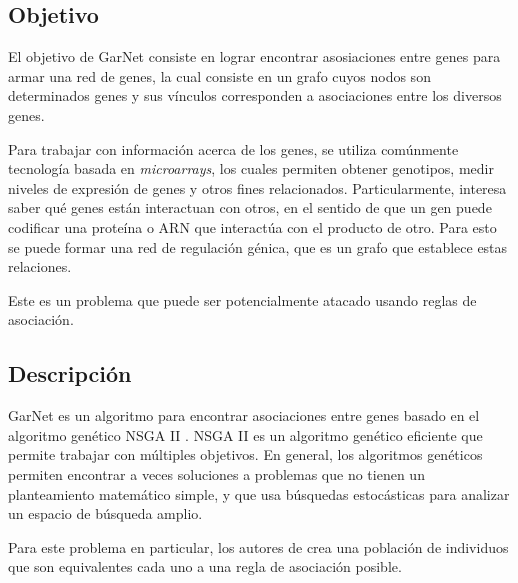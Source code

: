 \documentclass[12pt,spanish]{article}
\begin{document}
\subsection{Objetivo}
El objetivo de GarNet \cite{gene} consiste en lograr encontrar asosiaciones entre genes para armar una red de genes, la cual consiste en un grafo cuyos nodos son determinados genes y sus vínculos corresponden a asociaciones entre los diversos genes.

Para trabajar con información acerca de los genes, se utiliza comúnmente tecnología basada en \emph{microarrays}, los cuales permiten obtener genotipos, medir niveles de expresión de genes y otros fines relacionados. Particularmente, interesa saber qué genes están interactuan con otros, en el sentido de que un gen puede codificar una proteína o ARN que interactúa con el producto de otro. Para esto se puede formar una red de regulación génica, que es un grafo que establece estas relaciones.

Este es un problema que puede ser potencialmente atacado usando reglas de asociación.
\subsection{Descripción}
GarNet es un algoritmo para encontrar asociaciones entre genes basado en el algoritmo genético NSGA II \cite{nsga}. NSGA II es un algoritmo genético eficiente que permite trabajar con múltiples objetivos. En general, los algoritmos genéticos permiten encontrar a veces soluciones a problemas que no tienen un planteamiento matemático simple, y que usa búsquedas estocásticas para analizar un espacio de búsqueda amplio. 

Para este problema en particular, los autores de \cite{nsga} crea una población de individuos que son equivalentes cada uno a una regla de asociación posible. 





\end{document}
